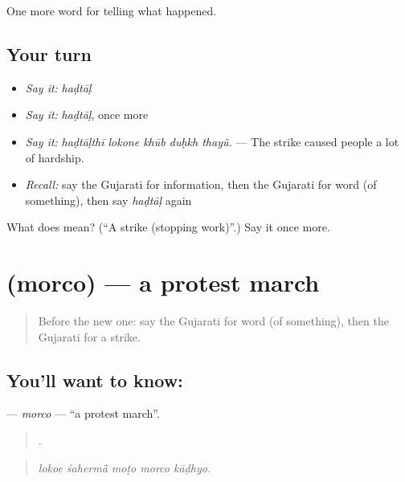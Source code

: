 \begin{grammarlens}[title={What you've built}]
One more word for telling what happened.
\end{grammarlens}

\subsection*{Your turn}
\begin{itemize}
\raggedright
  \item \emph{Say it:} \emph{haḍtāḷ}
  \item \emph{Say it:} \emph{haḍtāḷ}, once more
  \item \emph{Say it:} \emph{haḍtāḷthī lokone khūb duḥkh thayũ.} — The strike caused people a lot of hardship.
  \item \emph{Recall:} say the Gujarati for information, then the Gujarati for word (of something), then say \emph{haḍtāḷ} again
\end{itemize}

\begin{tcolorbox}[breakable,colback=teal!4,colframe=teal!35!black,title={Before you move on}]
What does  mean? (\textquotedblleft{}A strike (stopping work)\textquotedblright{}.) Say it once more.
\end{tcolorbox}
\section[\texorpdfstring{\gu{મોરચો} (morco)}{મોરચો (morco)}]{ (morco) — a protest march}

\label{lesson:GU-C314-morco}



\begin{quote}
Before the new one: say the Gujarati for word (of something), then the Gujarati for a strike.
\end{quote}

\subsection*{You'll want to know: }
\textbf{} — \emph{morco} — \textquotedblleft{}a protest march\textquotedblright{}.

\begin{quote}
    .
\end{quote}

\begin{quote}
\emph{lokoe śahermā̃ moṭo morco kāḍhyo.}
\end{quote}

